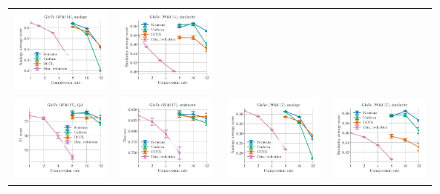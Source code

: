 \begin{figure}
\begin{tabular}{@{\hskip -0.0in}c@{\hskip -0.0in}c@{\hskip -0.0in}c@{\hskip -0.0in}c@{\hskip -0.0in}}
		\includegraphics[width=.245\linewidth]{figures/glove400k_intrinsics_analogy-avg-score_vs_compression_linx_stoc.pdf} &
		\includegraphics[width=.245\linewidth]{figures/glove400k_intrinsics_similarity-avg-score_vs_compression_linx_stoc.pdf} \\
		\includegraphics[width=.245\linewidth]{figures/glove-wiki400k-am_qa_best-f1_vs_compression_linx_stoc.pdf} &
		\includegraphics[width=.245\linewidth]{figures/glove-wiki400k-am_sentiment_sst_test-acc_vs_compression_linx_stoc.pdf} &
		\includegraphics[width=.245\linewidth]{figures/glove-wiki400k-am_intrinsics_analogy-avg-score_vs_compression_linx_stoc.pdf} &
		\includegraphics[width=.245\linewidth]{figures/glove-wiki400k-am_intrinsics_similarity-avg-score_vs_compression_linx_stoc.pdf} \\

\end{tabular}
\end{figure}
